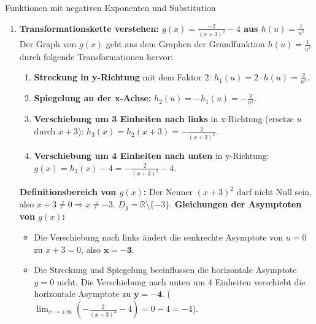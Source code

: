 \begin{loesungsumgebung}{Funktionen mit negativen Exponenten und Substitution}
\begin{enumerate}[label=(\alph*)]
    \item \textbf{Transformationskette verstehen: $g(x) = \frac{-2}{(x+3)^2} - 4$ aus $h(u) = \frac{1}{u^2}$}
    Der Graph von $g(x)$ geht aus dem Graphen der Grundfunktion $h(u) = \frac{1}{u^2}$ durch folgende Transformationen hervor:
    \begin{enumerate}
        \item \textbf{Streckung in y-Richtung} mit dem Faktor 2: $h_1(u) = 2 \cdot h(u) = \frac{2}{u^2}$.
        \item \textbf{Spiegelung an der x-Achse:} $h_2(u) = -h_1(u) = -\frac{2}{u^2}$.
        \item \textbf{Verschiebung um 3 Einheiten nach links} in x-Richtung (ersetze $u$ durch $x+3$): $h_3(x) = h_2(x+3) = -\frac{2}{(x+3)^2}$.
        \item \textbf{Verschiebung um 4 Einheiten nach unten} in y-Richtung: $g(x) = h_3(x) - 4 = -\frac{2}{(x+3)^2} - 4$.
    \end{enumerate}
    \textbf{Definitionsbereich von $g(x)$:}
    Der Nenner $(x+3)^2$ darf nicht Null sein, also $x+3 \neq 0 \Rightarrow x \neq -3$.
    $D_g = \mathbb{R} \setminus \{-3\}$.
    \textbf{Gleichungen der Asymptoten von $g(x)$:}
    \begin{itemize}
        \item Die Verschiebung nach links ändert die senkrechte Asymptote von $u=0$ zu $x+3=0$, also $\mathbf{x=-3}$.
        \item Die Streckung und Spiegelung beeinflussen die horizontale Asymptote $y=0$ nicht. Die Verschiebung nach unten um 4 Einheiten verschiebt die horizontale Asymptote zu $\mathbf{y=-4}$.
        ($\lim_{x \to \pm\infty} \left(-\frac{2}{(x+3)^2} - 4\right) = 0 - 4 = -4$).
    \end{itemize}
\end{enumerate}

\end{loesungsumgebung}


